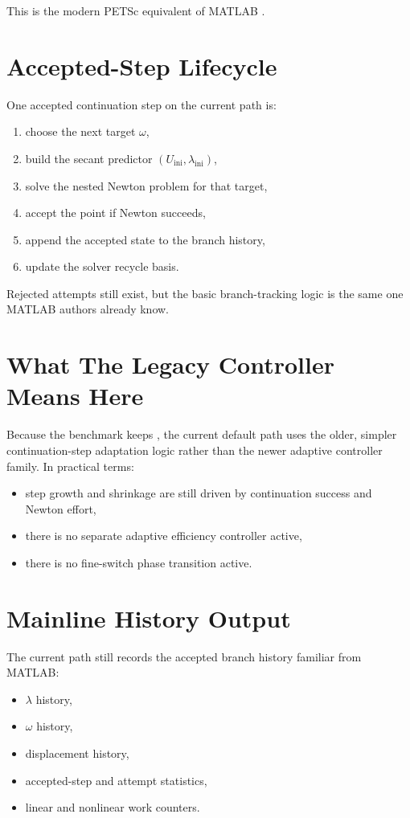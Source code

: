 This is the modern PETSc equivalent of MATLAB
.

\section{Accepted-Step Lifecycle}

One accepted continuation step on the current path is:
\begin{enumerate}
\item choose the next target \(\omega\),
\item build the secant predictor \((U_{\mathrm{ini}}, \lambda_{\mathrm{ini}})\),
\item solve the nested Newton problem for that target,
\item accept the point if Newton succeeds,
\item append the accepted state to the branch history,
\item update the solver recycle basis.
\end{enumerate}

Rejected attempts still exist, but the basic branch-tracking logic is the same
one MATLAB authors already know.

\section{What The Legacy Controller Means Here}

Because the benchmark keeps , the current
default path uses the older, simpler continuation-step adaptation logic rather
than the newer adaptive controller family. In practical terms:
\begin{itemize}
\item step growth and shrinkage are still driven by continuation success and
Newton effort,
\item there is no separate adaptive efficiency controller active,
\item there is no fine-switch phase transition active.
\end{itemize}

\section{Mainline History Output}

The current path still records the accepted branch history familiar from MATLAB:
\begin{itemize}
\item \(\lambda\) history,
\item \(\omega\) history,
\item displacement history,
\item accepted-step and attempt statistics,
\item linear and nonlinear work counters.
\end{itemize}

